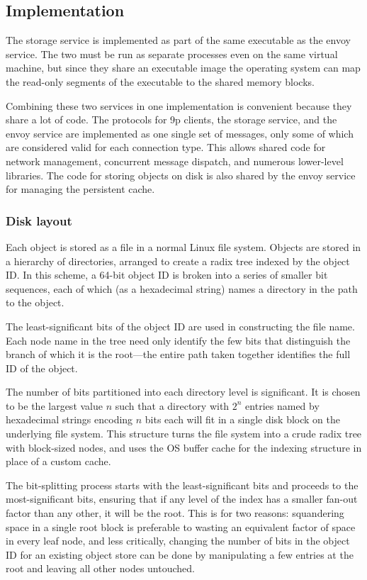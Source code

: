 \subsection{Implementation}

The storage service is implemented as part of the same executable as the envoy service. The two must be run as separate processes even on the same virtual machine, but since they share an executable image the operating system can map the read-only segments of the executable to the shared memory blocks.

Combining these two services in one implementation is convenient because they share a lot of code. The protocols for 9p clients, the storage service, and the envoy service are implemented as one single set of messages, only some of which are considered valid for each connection type. This allows shared code for network management, concurrent message dispatch, and numerous lower-level libraries. The code for storing objects on disk is also shared by the envoy service for managing the persistent cache.

\subsubsection{Disk layout}

Each object is stored as a file in a normal Linux file system. Objects are stored in a hierarchy of directories, arranged to create a radix tree indexed by the object ID. In this scheme, a 64-bit object ID is broken into a series of smaller bit sequences, each of which (as a hexadecimal string) names a directory in the path to the object.

The least-significant bits of the object ID are used in constructing the file name. Each node name in the tree need only identify the few bits that distinguish the branch of which it is the root---the entire path taken together identifies the full ID of the object.

The number of bits partitioned into each directory level is significant. It is chosen to be the largest value $n$ such that a directory with $2^n$ entries named by hexadecimal strings encoding $n$ bits each will fit in a single disk block on the underlying file system. This structure turns the file system into a crude radix tree with block-sized nodes, and uses the OS buffer cache for the indexing structure in place of a custom cache.

The bit-splitting process starts with the least-significant bits and proceeds to the most-significant bits, ensuring that if any level of the index has a smaller fan-out factor than any other, it will be the root. This is for two reasons: squandering space in a single root block is preferable to wasting an equivalent factor of space in every leaf node, and less critically, changing the number of bits in the object ID for an existing object store can be done by manipulating a few entries at the root and leaving all other nodes untouched.

